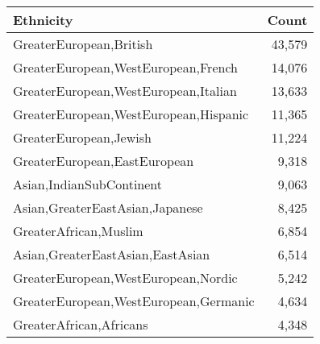 \begin{tabular}{lr}
    \toprule
    Ethnicity                             & Count  \\
    \midrule
    GreaterEuropean,British               & 43,579 \\
    GreaterEuropean,WestEuropean,French   & 14,076 \\
    GreaterEuropean,WestEuropean,Italian  & 13,633 \\
    GreaterEuropean,WestEuropean,Hispanic & 11,365 \\
    GreaterEuropean,Jewish                & 11,224 \\
    GreaterEuropean,EastEuropean          & 9,318  \\
    Asian,IndianSubContinent              & 9,063  \\
    Asian,GreaterEastAsian,Japanese       & 8,425  \\
    GreaterAfrican,Muslim                 & 6,854  \\
    Asian,GreaterEastAsian,EastAsian      & 6,514  \\
    GreaterEuropean,WestEuropean,Nordic   & 5,242  \\
    GreaterEuropean,WestEuropean,Germanic & 4,634  \\
    GreaterAfrican,Africans               & 4,348  \\
    \bottomrule
\end{tabular}

